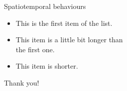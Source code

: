 \documentclass[10pt, aspectratio=169]{beamer}
\newenvironment{items}{
    \begin{itemize}
    \setlength{\itemsep}{10pt}
    \setlength{\parskip}{0pt}
    \setlength{\parsep}{0pt}}{
\end{itemize}
}
\begin{document}
\begin{frame}[fragile]{Spatiotemporal behaviours}
    \begin{minipage}[c]{0.5\textwidth}
    \begin{items}
        \item This is the first item of the list.
        \item This item is a little bit longer than\\the first one.
        \item This item is shorter.
    \end{items}
    \end{minipage}%
    \begin{minipage}[c]{0.5\textwidth}
    \end{minipage}%
\end{frame}

\begin{frame}[standout]
    Thank you!
\end{frame}

\appendix %
\end{document}
